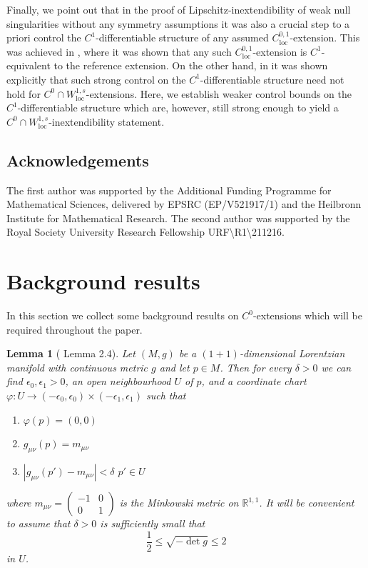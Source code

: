 \documentclass{article}
\newcommand{\loc}{\mathrm{loc}}
\newcommand{\R}{\mathbb{R}}
\newtheorem{lemma}[definition]{Lemma}
\begin{document}
Finally, we point out that in the proof \cite{SbieLip} of Lipschitz-inextendibility of weak null singularities without any symmetry assumptions it was also a crucial step to a priori control the $C^1$-differentiable structure of any assumed $C^{0,1}_{\loc}$-extension. This was achieved in \cite{sbierski2022uniqueness}, where it was shown that any such $C^{0,1}_{\loc}$-extension is $C^1$-equivalent to the reference extension. On the other hand, in \cite{CameronSbierski} it was shown explicitly that such strong control on the $C^1$-differentiable structure  need not hold for $C^0 \cap W^{1,s}_{\loc}$-extensions. Here, we establish weaker control bounds on the $C^1$-differentiable structure which are, however, still strong enough to yield a $C^0 \cap W^{1,s}_{\loc}$-inextendibility statement. 





\subsection*{Acknowledgements}

The first author was supported by the Additional Funding Programme for
Mathematical Sciences, delivered by EPSRC (EP/V521917/1) and the
Heilbronn Institute for Mathematical Research. The second author was supported by the Royal Society University Research Fellowship URF\textbackslash R1\textbackslash 211216. 

\section{Background results}

In this section we collect some background results on $C^0$-extensions which will be required throughout the paper. 

\begin{lemma}[\cite{SbierskiSchw} Lemma 2.4]\label{lemma:nearmink}
 Let $(M,g)$ be a $(1+1)$-dimensional Lorentzian manifold with continuous metric $g$ and let $p\in M$. Then for every $\delta>0$ we can find $\epsilon_0,\epsilon_1>0$, an open neighbourhood $U$ of $p$, and a coordinate chart $\varphi:U\rightarrow(-\epsilon_0,\epsilon_0)\times(-\epsilon_1,\epsilon_1)$ such that
    \begin{enumerate}
        \item $\varphi(p)=(0,0)$
        \item $g_{\mu\nu}(p)=m_{\mu\nu}$
        \item $|g_{\mu\nu}(p')-m_{\mu\nu}|<\delta$ $p'\in U$
    \end{enumerate}
where $m_{\mu\nu}=\begin{pmatrix}
    -1 & 0\\0 &1
\end{pmatrix}$ is the Minkowski metric on $\R^{1,1}$. It will be convenient to assume that $\delta>0$ is sufficiently small that
\begin{equation}
   \frac{1}{2}\leq\sqrt{-\det g}\leq 2\label{eqn:detbound}
\end{equation}
in $U$.
\end{lemma}
\end{document}
